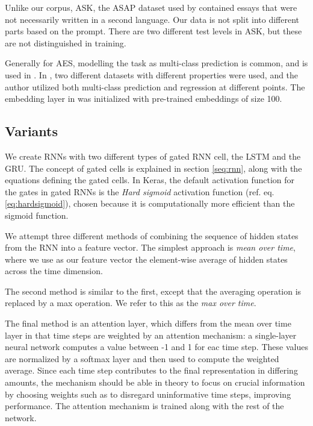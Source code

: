 Unlike our corpus, ASK, the ASAP dataset used by \citeauthor{taghipour16}
contained essays that were not necessarily written in a second language. Our
data is not split into different parts based on the prompt. There are two
different test levels in ASK, but these are not distinguished in training.

 Generally for \ac{AES}, modelling
the task as multi-class prediction is common, and is used in
\textcite{vajjala18universalCEFR}. In \textcite{vajjala17}, two different
datasets with different properties were used, and the author utilized both
multi-class prediction and regression at different points. The embedding
layer in \textcite{taghipour16} was initialized with pre-trained embeddings
of size 100.


\subsection{Variants}

We create \acp{RNN} with two different types of gated \ac{RNN} cell, the
\ac{LSTM} and the \ac{GRU}. The concept of gated cells is explained in
section \ref{seq:rnn}, along with the equations defining the gated cells. In
Keras, the default activation function for the gates in gated RNNs is the
\emph{Hard sigmoid} activation function (ref. eq. \ref{eq:hardsigmoid}),
chosen because it is computationally more efficient than the sigmoid
function.

We attempt three different methods of combining the sequence of hidden states
from the \ac{RNN} into a feature vector. The simplest approach is \emph{mean
over time}, where we use as our feature vector the element-wise average of
hidden states across the time dimension.

The second method is similar to the first, except that the averaging
operation is replaced by a max operation. We refer to this as the \emph{max
over time}.

The final method is an attention layer, which differs from the mean over
time layer in that time steps are weighted by an attention mechanism: a
single-layer neural network computes a value between -1 and 1 for eac
time step. These values are normalized by a softmax layer and then used to
compute the weighted average. Since each time step contributes to the final
representation in differing amounts, the mechanism should be able in theory
to focus on crucial information by choosing weights such as to disregard
uninformative time steps, improving performance. The attention mechanism is
trained along with the rest of the network.

